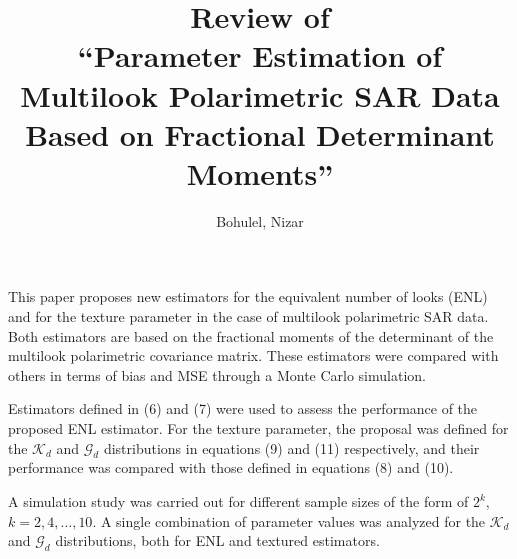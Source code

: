 \documentclass[journal,onecolumn,12pt]{IEEEtran}
\title{Review of\\
	``Parameter Estimation of Multilook Polarimetric SAR Data
	Based on Fractional Determinant Moments''}
\author{Bohulel, Nizar}
\begin{document}
	
\maketitle
{}
\setcounter{page}{1}
	
This paper proposes new estimators for the equivalent number of looks (ENL) and for the texture parameter in the case of multilook polarimetric SAR data. 
Both estimators are based on the fractional moments of the determinant of the multilook polarimetric covariance matrix. 
These estimators were compared with others in terms of bias and MSE through a Monte Carlo simulation. 

Estimators defined in (6) and (7) were used to assess the performance of the proposed ENL estimator. For the texture parameter, the proposal was defined for the $\mathcal{K}_d$ and $\mathcal{G}_d$ distributions in equations (9) and (11) respectively, and their performance was compared with those defined in equations (8) and (10).


A simulation study was carried out for different sample sizes of the form of $2^k$, $k=2, 4, \ldots,10$. 
A single combination of parameter values was analyzed for the $\mathcal{K}_d$ and $\mathcal{G}_d$ distributions, both for ENL and textured estimators.
\end{document}
